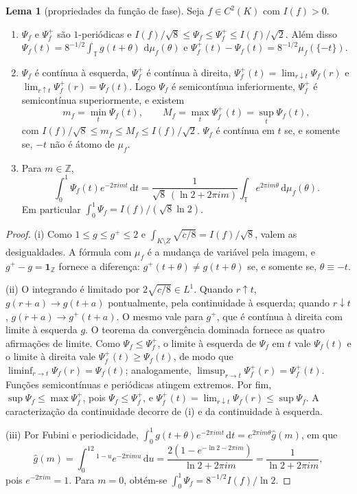 \documentclass[12pt,a4paper]{article}
\theoremstyle{preciso}
\theoremstyle{definition}
\newcommand{\dd}{\,\mathrm{d}}
\theoremstyle{preciso}
\theoremstyle{preciso}
\newtheorem{lemma}[teorema]{Lema}
\theoremstyle{preciso}
\theoremstyle{preciso}
\theoremstyle{definition}
\theoremstyle{preciso}
\theoremstyle{definition}
\theoremstyle{preciso}
\theoremstyle{preciso}
\theoremstyle{definition}
\begin{document}
\begin{lemma}[propriedades da função de fase]\label{map:artigo_2:12.5}
\label{artigo_2:lem:phase-function-properties}
Seja $f\in C^2(K)$ com $I(f)>0$.
\begin{enumerate}[label=(\roman*)]
\item $\Psi_f$ e $\Psi_f^+$ são $1$-periódicas e
 $I(f)/\sqrt8\le\Psi_f\le\Psi_f^+\le I(f)/\sqrt2$. Além disso
 $\Psi_f(t)=8^{-1/2}\int_{\mathbb T}g(t+\theta)\,\dd\mu_f(\theta)$ e
 $\Psi_f^+(t)-\Psi_f(t)=8^{-1/2}\mu_f(\{-t\})$.
\item $\Psi_f$ é contínua à esquerda, $\Psi_f^+$ é contínua à direita,
 $\Psi_f^+(t)=\lim_{r\downarrow t}\Psi_f(r)$ e $\lim_{r\uparrow t}\Psi_f^+(r)=\Psi_f(t)$.
 Logo $\Psi_f$ é semicontínua inferiormente, $\Psi_f^+$ é semicontínua
 superiormente, e existem
 \[
  m_f=\min_{t}\Psi_f(t),\qquad M_f=\max_t\Psi_f^+(t)=\sup_t\Psi_f(t),
 \]
 com $I(f)/\sqrt8\le m_f\le M_f\le I(f)/\sqrt2$.
 $\Psi_f$ é contínua em $t$ se, e somente se, $-t$ não é átomo de $\mu_f$.
\item Para $m\in\mathbb Z$,
 \[
  \int_0^1\Psi_f(t)e^{-2\pi imt}\dd t
  =\frac{1}{\sqrt8\,(\ln2+2\pi im)}\int_{\mathbb T}e^{2\pi im\theta}\dd\mu_f(\theta).
 \]
 Em particular $\int_0^1\Psi_f=I(f)/(\sqrt8\ln2)$.
\end{enumerate}
\end{lemma}

\begin{proof}
(i) Como $1\le g\le g^+\le2$ e $\int_{K\setminus Z}\sqrt{c/8}=I(f)/\sqrt8$, valem as
desigualdades. A fórmula com $\mu_f$ é a mudança de variável pela imagem, e
$g^+-g=\mathbf 1_{\mathbb Z}$ fornece a diferença: $g^+(t+\theta)\ne g(t+\theta)$
se, e somente se, $\theta\equiv-t$.

(ii) O integrando é limitado por $2\sqrt{c/8}\in L^1$. Quando $r\uparrow t$,
$g(r+a)\to g(t+a)$ pontualmente, pela continuidade à esquerda; quando
$r\downarrow t$, $g(r+a)\to g^+(t+a)$. O mesmo vale para $g^+$, que é
contínua à direita com limite à esquerda $g$. O teorema da convergência
dominada fornece as quatro afirmações de limite. Como $\Psi_f\le\Psi_f^+$, o limite à
esquerda de $\Psi_f$ em $t$ vale $\Psi_f(t)$ e o limite à direita vale
$\Psi_f^+(t)\ge\Psi_f(t)$, de modo que $\liminf_{r\to t}\Psi_f(r)=\Psi_f(t)$;
analogamente, $\limsup_{r\to t}\Psi_f^+(r)=\Psi_f^+(t)$. Funções
semicontínuas e periódicas atingem extremos. Por fim, $\sup\Psi_f\le\max\Psi_f^+$,
pois $\Psi_f\le\Psi_f^+$, e $\Psi_f^+(t)=\lim_{r\downarrow t}\Psi_f(r)\le\sup\Psi_f$.
A caracterização da continuidade decorre de (i) e da continuidade à esquerda.

(iii) Por Fubini e periodicidade,
$\int_0^1g(t+\theta)e^{-2\pi imt}\dd t=e^{2\pi im\theta}\hat g(m)$, em que
\[
 \hat g(m)=\int_0^12^{1-u}e^{-2\pi imu}\dd u
 =\frac{2(1-e^{-\ln2-2\pi im})}{\ln2+2\pi im}=\frac1{\ln2+2\pi im},
\]
pois $e^{-2\pi im}=1$. Para $m=0$, obtém-se $\int_0^1\Psi_f=8^{-1/2}I(f)/\ln2$.
\end{proof}
\end{document}
